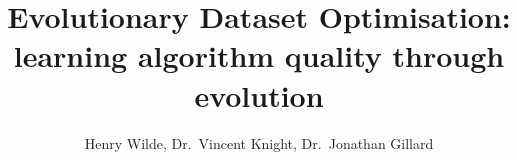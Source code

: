 \documentclass{svjour3}
\title{%
    Evolutionary Dataset Optimisation:
    learning algorithm quality through evolution
}
\author{Henry Wilde, Dr.\ Vincent Knight, Dr.\ Jonathan Gillard}
\date{}
\begin{document}
\maketitle%
\bigskip%


\newpage%






\pagebreak
\pagebreak\printbibliography
\end{document}
